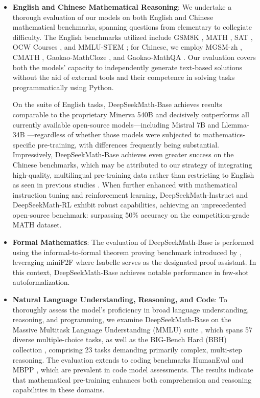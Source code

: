 \begin{itemize}[topsep=0pt]
    \item \textbf{English and Chinese Mathematical Reasoning}: We undertake a thorough evaluation of our models on both English and Chinese mathematical benchmarks, spanning questions from elementary to collegiate difficulty. The English benchmarks utilized include GSM8K \citep{gsm8k}, MATH \citep{MATH}, SAT \citep{llemma}, OCW Courses \citep{minerva}, and MMLU-STEM \citep{mmlu}; for Chinese, we employ MGSM-zh \citep{mgsm}, CMATH \citep{wei2023cmath}, Gaokao-MathCloze \citep{agieval}, and Gaokao-MathQA \citep{agieval}. Our evaluation covers both the models’ capacity to independently generate text-based solutions without the aid of external tools and their competence in solving tasks programmatically using Python.

    On the suite of English tasks, DeepSeekMath-Base achieves results comparable to the proprietary Minerva 540B \citep{minerva} and decisively outperforms all currently available open-source models—including Mistral 7B \citep{mistral} and Llemma-34B \citep{llemma}—regardless of whether those models were subjected to mathematics-specific pre-training, with differences frequently being substantial. Impressively, DeepSeekMath-Base achieves even greater success on the Chinese benchmarks, which may be attributed to our strategy of integrating high-quality, multilingual pre-training data rather than restricting to English as seen in previous studies \citep{minerva,llemma}. When further enhanced with mathematical instruction tuning and reinforcement learning, DeepSeekMath-Instruct and DeepSeekMath-RL exhibit robust capabilities, achieving an unprecedented open-source benchmark: surpassing 50\% accuracy on the competition-grade MATH dataset.

\item \textbf{Formal Mathematics}: The evaluation of DeepSeekMath-Base is performed using the informal-to-formal theorem proving benchmark introduced by \citep{dsp_proof}, leveraging miniF2F \citep{minif2f} where Isabelle \citep{isabelle} serves as the designated proof assistant. In this context, DeepSeekMath-Base achieves notable performance in few-shot autoformalization.

\item \textbf{Natural Language Understanding, Reasoning, and Code}: To thoroughly assess the model’s proficiency in broad language understanding, reasoning, and programming, we examine DeepSeekMath-Base on the Massive Multitask Language Understanding (MMLU) suite \citep{mmlu}, which spans 57 diverse multiple-choice tasks, as well as the BIG-Bench Hard (BBH) collection \citep{bbh}, comprising 23 tasks demanding primarily complex, multi-step reasoning. The evaluation extends to coding benchmarks HumanEval \citep{codex} and MBPP \citep{mbpp}, which are prevalent in code model assessments. The results indicate that mathematical pre-training enhances both comprehension and reasoning capabilities in these domains.
\end{itemize}

